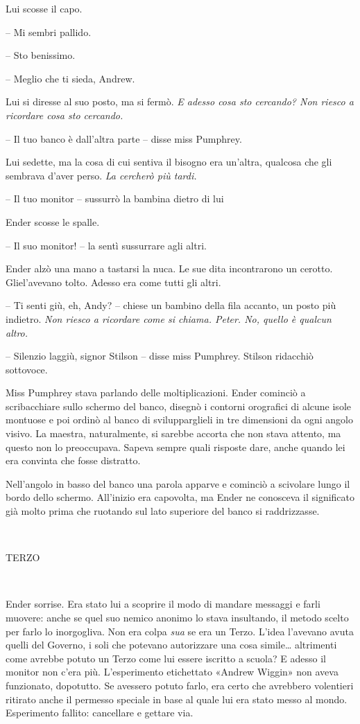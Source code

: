 {Lui scosse il capo.}

{-- Mi sembri pallido.}

{-- Sto benissimo.}

{-- Meglio che ti sieda, Andrew.}

{Lui si diresse al suo posto, ma si fermò. \emph{E adesso cosa sto
		cercando? Non riesco a ricordare cosa sto cercando.}}

{-- Il tuo banco è dall'altra parte -- disse miss Pumphrey.}

{Lui sedette, ma la cosa di cui sentiva il bisogno era un'altra,
	qualcosa che gli sembrava d'aver perso. \emph{La cercherò più tardi.}}

{-- Il tuo monitor -- sussurrò la bambina dietro di lui}

{Ender scosse le spalle.}

{-- Il suo monitor! -- la sentì sussurrare agli altri.}

{Ender alzò una mano a tastarsi la nuca. Le sue dita incontrarono un
	cerotto. Gliel'avevano tolto. Adesso era come tutti gli altri.}

{-- Ti senti giù, eh, Andy? -- chiese un bambino della fila accanto, un
	posto più indietro. \emph{Non riesco a ricordare come si chiama. Peter.
		No, quello è qualcun altro.}}

{-- Silenzio laggiù, signor Stilson -- disse miss Pumphrey. Stilson
	ridacchiò sottovoce.}

{Miss Pumphrey stava parlando delle moltiplicazioni. Ender cominciò a
	scribacchiare sullo schermo del banco, disegnò i contorni orografici di
	alcune isole montuose e poi ordinò al banco di svilupparglieli in tre
	dimensioni da ogni angolo visivo. La maestra, naturalmente, si sarebbe
	accorta che non stava attento, ma questo non lo preoccupava. Sapeva
	sempre quali risposte dare, anche quando lei era convinta che fosse
	distratto.}

{Nell'angolo in basso del banco una parola apparve e cominciò a
	scivolare lungo il bordo dello schermo. All'inizio era capovolta, ma
	Ender ne conosceva il significato già molto prima che ruotando sul lato
	superiore del banco si raddrizzasse.}

{~}

\begin{center}
	{TERZO}
\end{center}

{~}

{Ender sorrise. Era stato lui a scoprire il modo di mandare messaggi e
	farli muovere: anche se quel suo nemico anonimo lo stava insultando, il
	metodo scelto per farlo lo inorgogliva. Non era colpa \emph{sua} se era
	un Terzo. L'idea l'avevano avuta quelli del Governo, i soli che potevano
	autorizzare una cosa simile\ldots{} altrimenti come avrebbe potuto un
	Terzo come lui essere iscritto a scuola? E adesso il monitor non c'era
	più. L'esperimento etichettato «Andrew Wiggin» non aveva funzionato,
	dopotutto. Se avessero potuto farlo, era certo che avrebbero volentieri
	ritirato anche il permesso speciale in base al quale lui era stato messo
	al mondo. Esperimento fallito: cancellare e gettare via.}


